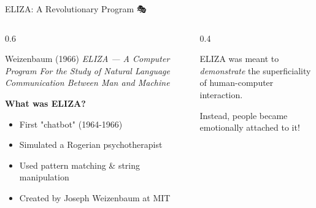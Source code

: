 \documentclass[aspectratio=169]{beamer}
\begin{document}
\begin{frame}{ELIZA: A Revolutionary Program 🎭}
\small
\begin{columns}
\begin{column}{0.6\textwidth}
\begin{block}{Weizenbaum (1966)}
\textit{ELIZA — A Computer Program For the Study of Natural Language Communication Between Man and Machine}
\end{block}

\vspace{0.15cm}

\textbf{What was ELIZA?}
\begin{itemize}\setlength{\itemsep}{0pt}
    \item First "chatbot" (1964-1966)
    \item Simulated a Rogerian psychotherapist
    \item Used pattern matching \& string manipulation
    \item Created by Joseph Weizenbaum at MIT
\end{itemize}
\end{column}

\begin{column}{0.4\textwidth}
\begin{thinkaboutit}
ELIZA was meant to \textit{demonstrate} the superficiality of human-computer interaction.

Instead, people became emotionally attached to it!
\end{thinkaboutit}
\end{column}
\end{columns}
\end{frame}
\end{document}
